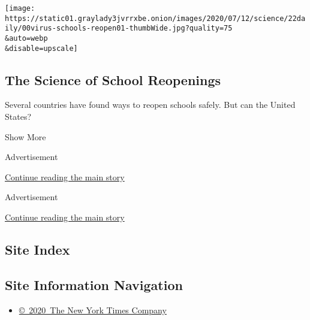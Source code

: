 \begin{enumerate}
  \texttt{[image: https://static01.graylady3jvrrxbe.onion/images/2020/07/12/science/22daily/00virus-schools-reopen01-thumbWide.jpg?quality=75\\\&auto=webp\\\&disable=upscale]}

  \hypertarget{the-science-of-school-reopenings}{%
  \subsection{The Science of School
  Reopenings}\label{the-science-of-school-reopenings}}

  Several countries have found ways to reopen schools safely. But can
  the United States?
\end{enumerate}

Show More

Advertisement

\protect\hyperlink{after-mid5}{Continue reading the main story}

Advertisement

\protect\hyperlink{after-mktg}{Continue reading the main story}

\hypertarget{site-index}{%
\subsection{Site Index}\label{site-index}}

\hypertarget{site-information-navigation}{%
\subsection{Site Information
Navigation}\label{site-information-navigation}}

\begin{itemize}
\tightlist
\item
  \href{https://help.nytimes3xbfgragh.onion/hc/en-us/articles/115014792127-Copyright-notice}{©~2020~The
  New York Times Company}
\end{itemize}

